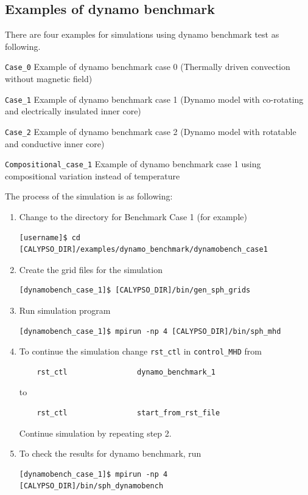 \subsection{Examples of dynamo benchmark}
There are four examples for simulations using dynamo benchmark test as following.
%
\begin{description}
\item{\tt Case\_0} Example of dynamo benchmark case 0 (Thermally driven convection without magnetic field)
\item{\tt Case\_1} Example of dynamo benchmark case 1 (Dynamo model with co-rotating and electrically insulated inner core)
\item{\tt Case\_2} Example of dynamo benchmark case 2 (Dynamo model with rotatable and conductive inner core)
\item{\tt Compositional\_case\_1} Example of dynamo benchmark case 1 using compositional variation instead of temperature
\end{description}
%
The process of the simulation is as following:
%
\begin{enumerate}
\item Change to the directory for Benchmark Case 1 (for example) \\
\begin{verbatim}
[username]$ cd [CALYPSO_DIR]/examples/dynamo_benchmark/dynamobench_case1
\end{verbatim}

\item  Create the grid files for the simulation  \\
\begin{verbatim}
[dynamobench_case_1]$ [CALYPSO_DIR]/bin/gen_sph_grids
\end{verbatim}

\item  Run simulation program
\begin{verbatim}
[dynamobench_case_1]$ mpirun -np 4 [CALYPSO_DIR]/bin/sph_mhd
\end{verbatim}

\item  To continue the simulation change \verb|rst_ctl| in \verb|control_MHD| from \\
\begin{verbatim}
    rst_ctl                dynamo_benchmark_1
\end{verbatim}
  to
\begin{verbatim}
    rst_ctl                start_from_rst_file
\end{verbatim}
   Continue simulation by repeating step 2.

\item  To check the results for dynamo benchmark, run 
\begin{verbatim}
[dynamobench_case_1]$ mpirun -np 4 [CALYPSO_DIR]/bin/sph_dynamobench
\end{verbatim}
\end{enumerate}
%

